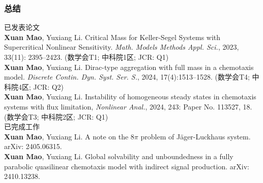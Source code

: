 \begin{frame}
  \frametitle{总结}
  已发表论文\\
  \textbf{Xuan Mao}, Yuxiang Li.
  Critical Mass for Keller-Segel Systems with Supercritical Nonlinear Sensitivity. 
  \emph{Math. Models Methods Appl. Sci.}, 2023, 33(11): 2395--2423.
  \hfill (数学会T1; 中科院1区; JCR: Q1)\\
  \textbf{Xuan Mao}, Yuxiang Li. 
  Dirac-type aggregation with full mass in a chemotaxis model. 
  \emph{Discrete Contin. Dyn. Syst. Ser. S.}, 2024, 17(4):1513--1528. 
  \hfill (数学会T4; 中科院4区; JCR: Q2)\\
  \textbf{Xuan Mao}, Yuxiang Li. 
  Instability of homogeneous steady states in chemotaxis systems with flux limitation, 
  \emph{Nonlinear Anal.}, 2024, 243: Paper No. 113527, 18.
  \hfill (数学会T3; 中科院2区; JCR: Q1)\\
  已完成工作\\
  \textbf{Xuan Mao}, Yuxiang Li. 
  A note on the $8\pi$ problem of J\"ager-Luckhaus system.
  {arXiv: 2405.06315}.\\ 
  \textbf{Xuan Mao}, Yuxiang Li.
  Global solvability and unboundedness in a fully parabolic quasilinear chemotaxis model with indirect signal production.
  {arXiv: 2410.13238}.
  
  \end{frame}